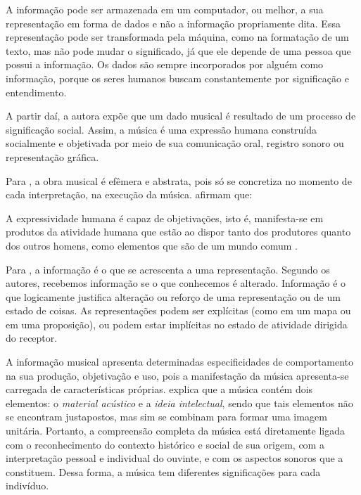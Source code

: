 A informação pode ser armazenada em um computador, ou melhor, a sua representação em forma de dados e não a informação propriamente dita. Essa representação pode ser transformada pela máquina, como na formatação de um texto, mas não pode mudar o significado, já que ele depende de uma pessoa que possui a informação. Os dados são sempre incorporados por alguém como informação, porque os seres humanos buscam constantemente por significação e entendimento.

A partir daí, a autora  expõe que um dado musical é resultado de um processo de significação social. Assim, a música é uma expressão humana construída socialmente e objetivada por meio de sua comunicação oral, registro sonoro ou representação gráfica.

Para , a obra musical é efêmera e abstrata, pois só se concretiza no momento de cada interpretação, na execução da música.  afirmam que:

\begin{citacao}
A expressividade humana é capaz de objetivações, isto é, manifesta-se em produtos da atividade humana que estão ao dispor tanto dos produtores quanto dos outros homens, como elementos que são de um mundo comum \cite{berger&luckmann2014}.
\end{citacao}

Para , a informação é o que se acrescenta a uma representação. Segundo os autores, recebemos informação se o que conhecemos é alterado. Informação é o que logicamente justifica alteração ou reforço de uma representação ou de um estado de coisas. As representações podem ser explícitas (como em um mapa ou em uma proposição), ou podem estar implícitas no estado de atividade dirigida do receptor.

A informação musical apresenta determinadas especificidades de comportamento na sua produção, objetivação e uso, pois a manifestação da música apresenta-se carregada de características próprias.  explica que a música contém dois elementos: o \textit{material acústico} e a \textit{ideia intelectual}, sendo que tais elementos não se encontram justapostos, mas sim se combinam para formar uma imagem unitária. Portanto, a compreensão completa da música está diretamente ligada com o reconhecimento do contexto histórico e social de sua origem, com a interpretação pessoal e individual do ouvinte, e com os aspectos sonoros que a constituem. Dessa forma, a música tem diferentes significações para cada indivíduo.


